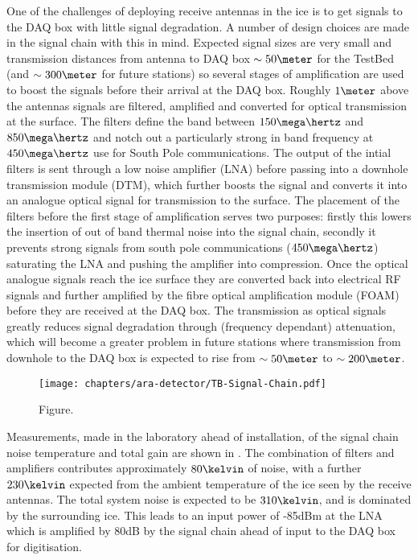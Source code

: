 One of the challenges of deploying receive antennas in the ice is to get signals to the DAQ box with little signal degradation. A number of design choices are made in the signal chain with this in mind. Expected signal sizes are very small and transmission distances from antenna to DAQ box $\sim 50\meter$ for the TestBed (and $\sim 300\meter$ for future stations) so several stages of amplification are used to boost the signals before their arrival at the DAQ box. Roughly $1 \meter$ above the antennas signals are filtered, amplified and converted for optical transmission at the surface. The filters define the band between $150 \mega\hertz$ and $850 \mega\hertz$ and notch out a particularly strong in band frequency at $450 \mega \hertz$ use for South Pole communications. The output of the intial filters is sent through a low noise amplifier (LNA) before passing into a downhole transmission module (DTM), which further boosts the signal and converts it into an analogue optical signal for transmission to the surface. The placement of the filters before the first stage of amplification serves two purposes: firstly this lowers the insertion of out of band thermal noise into the signal chain, secondly it prevents strong signals from south pole communications ($450 \mega\hertz$) saturating the LNA and pushing the amplifier into compression. Once the optical analogue signals reach the ice surface they are converted back into electrical RF signals and further amplified by the fibre optical amplification module (FOAM) before they are received at the DAQ box. The transmission as optical signals greatly reduces signal degradation through (frequency dependant) attenuation, which will become a greater problem in future stations where transmission from downhole to the DAQ box is expected to rise from $\sim 50 \meter$ to $\sim 200\meter$.

\begin{figure}[htpb]
  \centering
  \texttt{[image: chapters/ara-detector/TB-Signal-Chain.pdf]}
  \caption{Figure.}
  \label{fig:ara-detector:TestBed:Signal-Chain}
\end{figure}




Measurements, made in the laboratory ahead of installation, of the signal chain noise temperature and total gain are shown in . The combination of filters and amplifiers contributes approximately $80 \kelvin$ of noise, with a further $230 \kelvin$ expected from the ambient temperature of the ice seen by the receive antennas. The total system noise is expected to be $310 \kelvin$, and is dominated by the surrounding ice. This leads to an input power of -85dBm at the LNA which is amplified by 80dB by the signal chain ahead of input to the DAQ box for digitisation.

